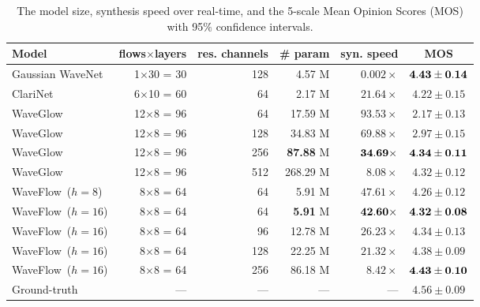 \documentclass{article}
\newcommand{\NA}{---}
\begin{document}
\begin{table*}[t!]
\centering
\caption{The model size, synthesis speed over real-time, and the 5-scale Mean Opinion Scores (MOS) with 95$\%$ confidence intervals. }
\vspace{0.2em}
\begin{tabular}{l|r|r|r|r|c}
\hline 
\textbf{Model}  & \textbf{flows$\times$layers} & \textbf{res. channels} & \textbf{\# param} & \textbf{syn. speed} & \textbf{MOS}
\\ \hline
Gaussian WaveNet & 1$\times$30 = 30  & 128 \qquad &  {4.57} M & ${0.002\times}$\qquad & ${\bf 4.43 \pm 0.14}$   \\ 
ClariNet & 6$\times$10 = 60  & 64 \qquad &  2.17 M & ${21.64\times}$\qquad & ${4.22 \pm 0.15}$   \\ 
WaveGlow & 12$\times$8 = 96   & {64} \qquad & 17.59 M & $93.53\times$\qquad & ${2.17 \pm 0.13}$   \\ 
WaveGlow & 12$\times$8 = 96  & 128 \qquad & 34.83 M & $69.88\times$\qquad & $2.97 \pm 0.15$      \\ 
WaveGlow & 12$\times$8 = 96  & {256} \qquad & {\bf 87.88} M & ${\bf 34.69\times}$\qquad & ${\bf 4.34 \pm 0.11}$   \\ 
WaveGlow & 12$\times$8 = 96  & 512 \qquad & 268.29 M & $8.08\times$\qquad  & $4.32 \pm 0.12$  \\ 
WaveFlow~($h=8$) & 8$\times$8 = 64 & 64 \qquad & 5.91 M &  $47.61\times$ \qquad & $4.26 \pm 0.12$   \\ 
WaveFlow~($h=16$) & 8$\times$8 = 64 & {64} \qquad & {\bf 5.91} M &  ${\bf 42.60\times}$
\qquad & ${\bf 4.32 \pm 0.08}$   \\ 
WaveFlow~($h=16$) & 8$\times$8 = 64 &  96 \qquad & 12.78 M & $26.23\times$ \qquad & $4.34 \pm 0.13$   \\ 
WaveFlow~($h=16$) & 8$\times$8 = 64  & 128 \qquad & 22.25 M &  $21.32\times$
\qquad & $4.38 \pm 0.09$  \\ 
WaveFlow~($h=16$) & 8$\times$8 = 64 & {256} \qquad  & {86.18} M  &  ${8.42\times}$
\qquad  & ${\bf 4.43 \pm 0.10}$   \\ \hline
Ground-truth & \NA \qquad & \NA\qquad & \NA \qquad & \NA \qquad &   $4.56 \pm 0.09$ \\ \hline
\end{tabular}
\vspace{-.1cm}
\label{tab:mos_speech}
\end{table*}
\end{document}
